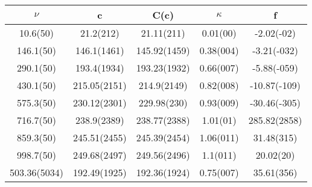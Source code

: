 \begin{table}[H]
	\centering
	\begin{tabular}{ccccc}
		$\nu$ & c & C(c) & $\kappa$ & f\\
		\hline
		10.6(50) & 21.2(212) & 21.11(211) & 0.01(00) & -2.02(-02)	\\
		146.1(50) & 146.1(1461) & 145.92(1459) & 0.38(004) & -3.21(-032)	\\
		290.1(50) & 193.4(1934) & 193.23(1932) & 0.66(007) & -5.88(-059)	\\
		430.1(50) & 215.05(2151) & 214.9(2149) & 0.82(008) & -10.87(-109)	\\
		575.3(50) & 230.12(2301) & 229.98(230) & 0.93(009) & -30.46(-305)	\\
		716.7(50) & 238.9(2389) & 238.77(2388) & 1.01(01) & 285.82(2858)	\\
		859.3(50) & 245.51(2455) & 245.39(2454) & 1.06(011) & 31.48(315)	\\
		998.7(50) & 249.68(2497) & 249.56(2496) & 1.1(011) & 20.02(20)	\\
		503.36(5034) & 192.49(1925) & 192.36(1924) & 0.75(007) & 35.61(356)	\\
	\end{tabular}
\end{table}